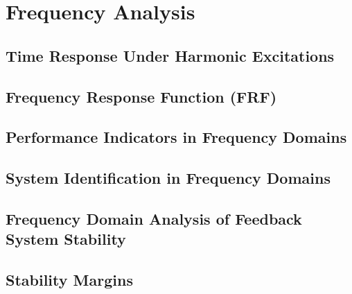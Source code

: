 \documentclass[12pt,letter]{article}
\begin{document}
	
%	

	\setcounter{section}{7}	

\section{Frequency Analysis}

\subsection{Time Response Under Harmonic Excitations}



\subsection{Frequency Response Function (FRF)}



\subsection{Performance Indicators in Frequency Domains}


\subsection{System Identification in Frequency Domains}


\subsection{Frequency Domain Analysis of Feedback System Stability}


\subsection{Stability Margins}

\end{document}
